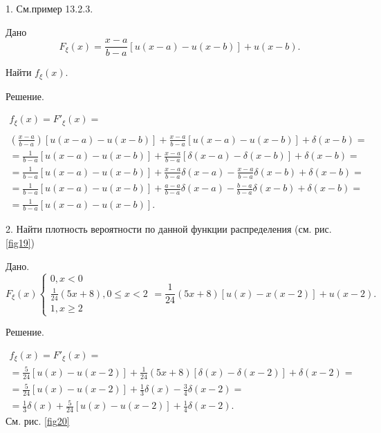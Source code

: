 \begin{example}
	1. См.пример 13.2.3. 

	Дано
	\begin{equation}
		F_{\xi}(x)=\frac{x-a}{b-a}[u(x-a)-u(x-b)]+u(x-b).
	\end{equation}

	Найти $f_{\xi}(x)$.

	Решение.

	\begin{gather*}
		f_{\xi}(x)=F'_{\xi}(x)=\\
		\\\left(\frac{x-a}{b-a}\right)[u(x-a)-u(x-b)]+\frac{x-a}{b-a}
		[u(x-a)-u(x-b)]+\delta(x-b)=\\
		=\frac{1}{b-a}[u(x-a)-u(x-b)]+\frac{x-a}{b-a}[\delta(x-a)-\delta(x-b)]+\delta(x-b)=\\=
		\frac{1}{b-a}[u(x-a)-u(x-b)]+\frac{x-a}{b-a}\delta(x-a)
		-\frac{x-a}{b-a}\delta(x-b)+\delta(x-b)=\\=
		\frac{1}{b-a}[u(x-a)-u(x-b)]+\frac{a-a}{b-a}\delta(x-a)-\frac{b-a}{b-a}\delta(x-b)+\delta(x-b)=\\=\frac{1}{b-a}[u(x-a)-u(x-b)].
	\end{gather*}

	2. Найти плотность вероятности по данной функции распределения
	(см. рис. \ref{fig19})
	
	Дано.
	\begin{equation*}
		F_{\xi}(x)
		\begin{cases}
			0, x<0 \\
			\frac{1}{24}(5x+8), 0\leqslant x<2 \\
			1, x\geqslant 2
		\end{cases}
		=\frac{1}{24}(5x+8)[u(x)-x(x-2)]+u(x-2).
	\end{equation*}

	Решение.

	\begin{gather*}
		f_{\xi}(x)=F'_{\xi}(x)=\\=
		\frac{5}{24}[u(x)-u(x-2)]+\frac{1}{24}(5x+8)[\delta(x)-\delta(x-2)]+\delta(x-2)=\\=
		\frac{5}{24}[u(x)-u(x-2)]+\frac{1}{3}\delta(x)-\frac{3}{4}\delta(x-2)=\\=
		\frac{1}{3}\delta(x)+\frac{5}{24}[u(x)-u(x-2)]+\frac{1}{4}\delta(x-2).
	\end{gather*}
	См. рис. \ref{fig20}
\end{example}
